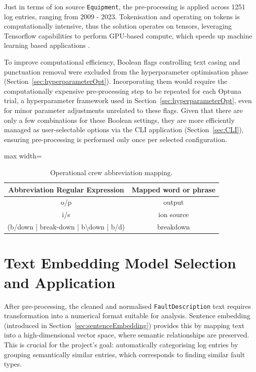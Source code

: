 \documentclass[10pt,oneside]{report}
\begin{document}
Just in terms of ion source \texttt{Equipment}, the pre-processing is applied across 1251 log entries, ranging from 2009 - 2023. Tokenisation and operating on tokens is computationally intensive, thus the solution operates on tensors, leveraging Tensorflow capabilities to perform GPU-based compute, which speeds up machine learning based applications \cite{tensorflow2015whitepaper, baldini2014predicting}.

To improve computational efficiency, Boolean flags controlling text casing and punctuation removal were excluded from the hyperparameter optimisation phase (Section~\ref{sec:hyperparameterOpt}). Incorporating them would require the computationally expensive pre-processing step to be repeated for each Optuna \cite{akiba2019optuna} trial, a hyperparameter framework used in Section~\ref{sec:hyperparameterOpt}, even for minor parameter adjustments unrelated to these flags. Given that there are only a few combinations for these Boolean settings, they are more efficiently managed as user-selectable options via the CLI application (Section~\ref{sec:CLI}), ensuring pre-processing is performed only once per selected configuration.

\begin{table}[htbp]
    \fontsize{8}{12}\selectfont
    \centering
    \begin{adjustbox}{max width=\textwidth}
    \begin{tabular}{c | c}
        \toprule
        \textbf{Abbreviation Regular Expression} & \textbf{Mapped word or phrase} \\
        \midrule
        {o/p} & {output} \\
        {i/s} & {ion source} \\
        {(b/down | break-down | b\textbackslash down | b/d)} & {breakdown} \\
        \bottomrule
    \end{tabular}
    \end{adjustbox}
    \caption{Operational crew abbreviation mapping.}
    \label{tab:abbrevCrew}
\end{table}


\section{Text Embedding Model Selection and Application}
After pre-processing, the cleaned and normalised \texttt{FaultDescription} text requires transformation into a numerical format suitable for analysis. Sentence embedding (introduced in Section~\ref{sec:sentenceEmbedding}) provides this by mapping text into a high-dimensional vector space, where semantic relationships are preserved. This is crucial for the project's goal: automatically categorising log entries by grouping semantically similar entries, which corresponds to finding similar fault types. 
\end{document}
